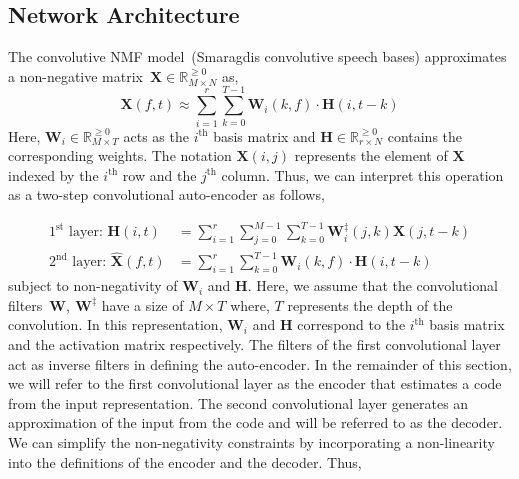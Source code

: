 \documentclass{article}
\begin{document}
\subsection{Network Architecture}
\label{sec:conv-nmf}
The convolutive NMF model~\cite{}(Smaragdis convolutive speech bases) approximates a non-negative matrix~$\mathbf{X}\in \mathbb{R}_{M \times N}^{\geq0}$ as,
\begin{equation}
    \mathbf{X}(f,t) \approx \sum_{i=1}^{r} \sum_{k=0}^{T-1} \mathbf{W}_{i}(k,f)\cdot\mathbf{H}(i,t-k)
\end{equation}
Here, $\mathbf{W}_{i} \in \mathbb{R}_{M \times T}^{\geq0}$ acts as the $i^{\text{th}}$ basis matrix and $\mathbf{H} \in \mathbb{R}_{r \times N}^{\geq0}$ contains the corresponding weights. The notation $\mathbf{X}(i,j)$ represents the element of $\mathbf{X}$ indexed by the $i^{\text{th}}$ row and the $j^{\text{th}}$ column. Thus, we can interpret this operation as a two-step convolutional auto-encoder as follows,

\begin{align}
    \text{$1^{\text{st}}$ layer:~}\mathbf{H}(i,t) &= \sum_{i=1}^{r} \sum_{j=0}^{M-1} \sum_{k=0}^{T-1} \mathbf{W}_{i}^{\ddagger}(j,k)\mathbf{X}(j,t-k) \\
    \text{$2^{\text{nd}}$ layer:~}\hat{\mathbf{X}}(f,t) &= \sum_{i=1}^{r} \sum_{k=0}^{T-1} \mathbf{W}_{i}(k,f)\cdot\mathbf{H}(i,t-k)
    \label{eq:nmfcnncnn}
\end{align}
subject to non-negativity of $\mathbf{W}_{i}$ and $\mathbf{H}$. Here, we assume that the convolutional filters~$\mathbf{W},~\mathbf{W}^{\ddagger}$ have a size of $M\times T$ where, $T$ represents the depth of the convolution. In this representation, $\mathbf{W}_{i}$ and $\mathbf{H}$ correspond to the $i^{\text{th}}$ basis matrix and the activation matrix respectively. The filters of the first convolutional layer act as inverse filters in defining the auto-encoder. In the remainder of this section, we will refer to the first convolutional layer as the encoder that estimates a code from the input representation. The second convolutional layer generates an approximation of the input from the code and will be referred to as the decoder. We can simplify the non-negativity constraints by incorporating a non-linearity into the definitions of the encoder and the decoder. Thus,
\end{document}
